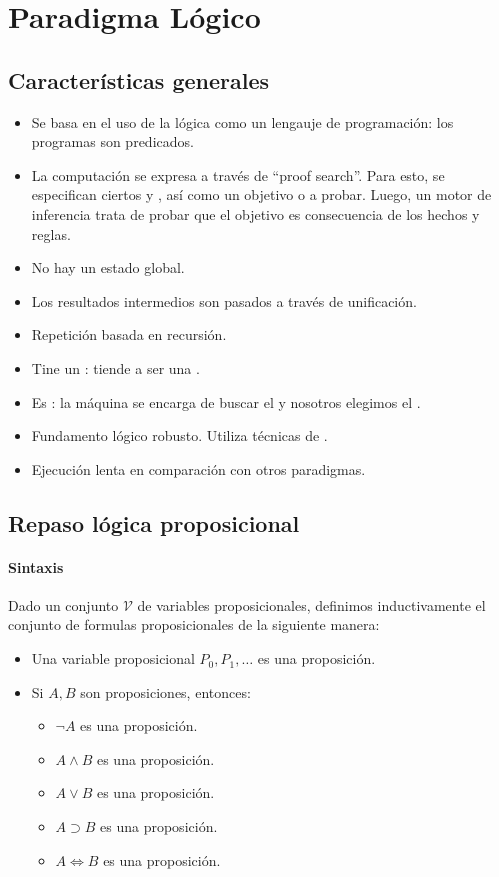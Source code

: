 \section{Paradigma Lógico}

\subsection{Características generales}

\begin{itemize}
  \item Se basa en el uso de la lógica como un lengauje de programación: los programas son predicados.
  \item La computación se expresa a través de ``proof search''. Para esto, se especifican ciertos  y , así como un objetivo o  a probar. Luego, un motor de inferencia trata de probar que el objetivo es consecuencia de los hechos y reglas.
  \item No hay un estado global.
  \item Los resultados intermedios son pasados a través de unificación.
  \item Repetición basada en recursión.
  \item Tine un : tiende a ser una .
  \item Es : la máquina se encarga de buscar el  y nosotros elegimos el .
  \item Fundamento lógico robusto. Utiliza técnicas de .
  \item Ejecución lenta en comparación con otros paradigmas.
\end{itemize}

\subsection{Repaso lógica proposicional}

\paragraph{Sintaxis}

Dado un conjunto $\mathcal{V}$ de variables proposicionales, definimos inductivamente el conjunto de formulas proposicionales de la siguiente manera:

\begin{itemize}
  \item Una variable proposicional $P_0, P_1, \dots$ es una proposición.
  \item Si $A, B$ son proposiciones, entonces:
    \begin{itemize}
      \item $\lnot A$ es una proposición.
      \item $A \land B$ es una proposición.
      \item $A \lor B$ es una proposición.
      \item $A \supset B$ es una proposición.
      \item $A \iff B$ es una proposición.
    \end{itemize}
\end{itemize}


